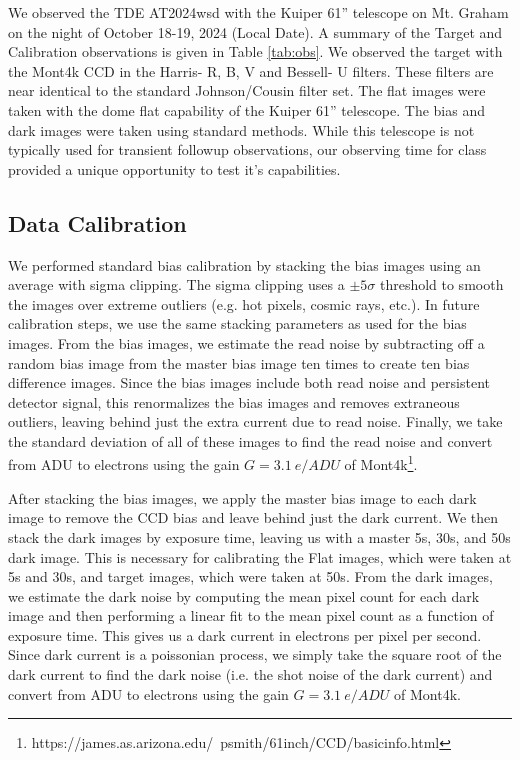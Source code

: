 \documentclass{aastex631}
\begin{document}
We observed the TDE AT2024wsd with the Kuiper 61'' telescope on Mt. Graham on the night of October 18-19, 2024 (Local Date). A summary of the Target and Calibration observations is given in Table \ref{tab:obs}. We observed the target with the Mont4k CCD in the Harris- R, B, V and Bessell- U filters. These filters are near identical to the standard Johnson/Cousin filter set. The flat images were taken with the dome flat capability of the Kuiper 61'' telescope. The bias and dark images were taken using standard methods. While this telescope is not typically used for transient followup observations, our observing time for class provided a unique opportunity to test it's capabilities. 

\subsection{Data Calibration}
We performed standard bias calibration by stacking the bias images using an average with sigma clipping. The sigma clipping uses a $\pm 5 \sigma$ threshold to smooth the images over extreme outliers (e.g. hot pixels, cosmic rays, etc.). In future calibration steps, we use the same stacking parameters as used for the bias images. From the bias images, we estimate the read noise by subtracting off a random bias image from the master bias image ten times to create ten bias difference images. Since the bias images include both read noise and persistent detector signal, this renormalizes the bias images and removes extraneous outliers, leaving behind just the extra current due to read noise. Finally, we take the standard deviation of all of these images to find the read noise and convert from ADU to electrons using the gain  $G=3.1~e/ADU$ of Mont4k\footnote{https://james.as.arizona.edu/~psmith/61inch/CCD/basicinfo.html}.

After stacking the bias images, we apply the master bias image to each dark image to remove the CCD bias and leave behind just the dark current. We then stack the dark images by exposure time, leaving us with a master 5s, 30s, and 50s dark image. This is necessary for calibrating the Flat images, which were taken at 5s and 30s, and target images, which were taken at 50s. From the dark images, we estimate the dark noise by computing the mean pixel count for each dark image and then performing a linear fit to the mean pixel count as a function of exposure time. This gives us a dark current in electrons per pixel per second. Since dark current is a poissonian process, we simply take the square root of the dark current to find the dark noise (i.e. the shot noise of the dark current) and convert from ADU to electrons using the gain $G=3.1~e/ADU$ of Mont4k. 
\end{document}
